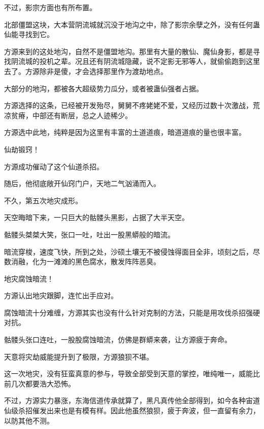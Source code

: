 \begin{this_body}
不过，影宗方面也有所布置。

北部僵盟这块，大本营阴流城就沉没于地沟之中，除了影宗余孽之外，没有任何蛊仙能寻找到它。

方源来到的这处地沟，自然不是僵盟地沟。那里有大量的散仙、魔仙身影，都是寻找阴流城的投机之辈。况且还有阴流城隐藏，说不定影无邪等人，就偷偷跑到这里去了。方源除非是傻，才会选择那里作为渡劫地点。

大部分的地沟，都被各大超级势力瓜分，或者被蛊仙强者占据。

方源选择的这条，已经被开发殆尽，舅舅不疼姥姥不爱，又经历过数十次激战，荒凉贫瘠，中部还有断层，总之人迹稀少。

方源选中此地，纯粹是因为这里有丰富的土道道痕，暗道道痕的量也很丰富。

仙劫锻窍！

方源成功催动了这个仙道杀招。

随后，他彻底敞开仙窍门户，天地二气汹涌而入。

不久，第五次地灾成形。

天空晦暗下来，一只巨大的骷髅头黑影，占据了大半天空。

骷髅头桀桀大笑，张口一吐，吐出一股黑蟒般的暗流。

暗流穿梭，速度飞快，所到之处，沙硕土壤无不被侵蚀得面目全非，顷刻之后，尽数消融，化为一滩滩的黑色腐水，散发阵阵恶臭。

地灾腐蚀暗流！

方源认出地灾跟脚，连忙出手应对。

腐蚀暗流十分难缠，方源其实也没有什么针对克制的方法，只能是用攻伐杀招强硬对抗。

骷髅头张口连吐，一股股腐蚀暗流，仿佛是群蟒来袭，让方源疲于奔命。

天意将灾劫威能提升到了极限，方源狼狈不堪。

这一次地灾，没有狂蛮真意的参与，导致全部受到天意的掌控，唯纯唯一，威能比前几次都要浩大恐怖。

不过，方源实力暴涨，东海信道传承就算了，黑凡真传他全部得到，如今各种宙道仙级杀招催发出来也是有模有样。因此他虽然狼狈，疲于奔波，但一直留有余力，以防其他不测。

\end{this_body}

